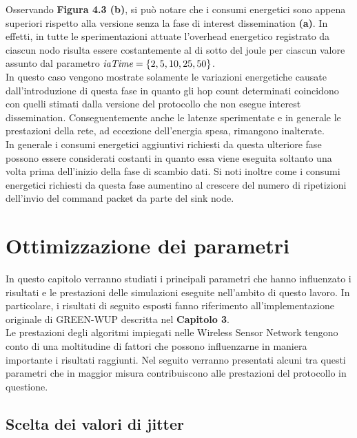 \documentclass[binding=0.6cm,TFA]{sapthesis}
\begin{document}
Osservando \textbf{Figura 4.3 (b)}, si può notare che i consumi energetici sono appena superiori rispetto alla versione senza la fase di interest dissemination
\textbf{(a)}. In effetti, in tutte le sperimentazioni attuate l'overhead energetico registrato da ciascun nodo risulta essere costantemente al di sotto del
joule per ciascun valore assunto dal parametro $\emph{iaTime}=\{2,5,10,25,50\}$.\\

In questo caso vengono mostrate solamente le variazioni energetiche causate dall'introduzione di questa fase in quanto gli hop count determinati
coincidono con quelli stimati dalla versione del protocollo che non esegue interest dissemination. Conseguentemente anche le latenze sperimentate
e in generale le prestazioni della rete, ad eccezione dell'energia spesa, rimangono inalterate.\\

In generale i consumi energetici aggiuntivi richiesti da questa ulteriore fase possono essere considerati costanti in quanto essa viene eseguita soltanto una
volta prima dell'inizio della fase di scambio dati. Si noti inoltre come i consumi energetici richiesti da questa fase aumentino al crescere del
numero di ripetizioni dell'invio del command packet da parte del sink node.\\

\chapter{Ottimizzazione dei parametri}

In questo capitolo verranno studiati i principali parametri che hanno influenzato i risultati e le prestazioni delle simulazioni eseguite nell'ambito di
questo lavoro. In particolare, i risultati di seguito esposti fanno riferimento all'implementazione originale di GREEN-WUP descritta nel \textbf{Capitolo 3}.\\

Le prestazioni degli algoritmi impiegati nelle Wireless Sensor Network tengono conto di una moltitudine di fattori che possono influenzarne in
maniera importante i risultati raggiunti. Nel seguito verranno presentati alcuni tra questi parametri che in maggior misura contribuiscono alle
prestazioni del protocollo in questione.

\section{Scelta dei valori di jitter}
\end{document}
